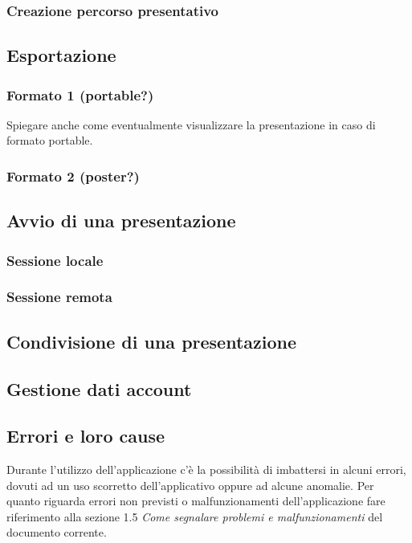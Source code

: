 \subsubsection{Creazione percorso presentativo}

\subsection{Esportazione}
\subsubsection{Formato 1 (portable?)}
Spiegare anche come eventualmente visualizzare la presentazione in caso di formato portable.
\subsubsection{Formato 2 (poster?)}

\subsection{Avvio di una presentazione}
\subsubsection{Sessione locale}
\subsubsection{Sessione remota}

\subsection{Condivisione di una presentazione}

\subsection{Gestione dati account}

\subsection{Errori e loro cause}
Durante l'utilizzo dell'applicazione c'è la possibilità di imbattersi in alcuni errori, dovuti ad un uso scorretto dell'applicativo oppure ad alcune anomalie. Per quanto riguarda errori non previsti o malfunzionamenti dell'applicazione fare riferimento alla sezione 1.5 \emph{Come segnalare problemi e malfunzionamenti} del documento corrente.\\


